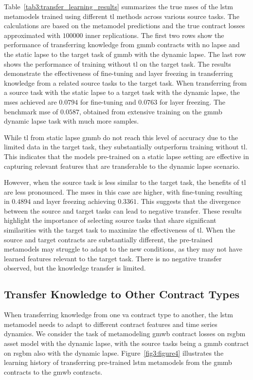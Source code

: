 Table~\ref{tab3:transfer_learning_results} summarizes the true \gls{mse}s of the \gls{lstm} metamodels trained using different \gls{tl} methods across various source tasks.
The calculations are based on the metamodel predictions and the true contract losses approximated with $\num{100000}$ inner replications.
The first two rows show the performance of transferring knowledge from \gls{gmmb} contracts with no lapse and the static lapse to the target task of \gls{gmmb} with the dynamic lapse.
The last row shows the performance of training without \gls{tl} on the target task.
The results demonstrate the effectiveness of fine-tuning and layer freezing in transferring knowledge from a related source tasks to the target task. 
When transferring from a source task with the static lapse to a target task with the dynamic lapse, the \gls{mse}s achieved are $0.0794$ for fine-tuning and $0.0763$ for layer freezing.
The benchmark \gls{mse} of $0.0587$, obtained from extensive training on the \gls{gmmb} dynamic lapse task with much more samples.

While \gls{tl} from static lapse \gls{gmmb} do not reach this level of accuracy due to the limited data in the target task, they substantially outperform training without \gls{tl}. 
This indicates that the models pre-trained on a static lapse setting are effective in capturing relevant features that are transferable to the dynamic lapse scenario.

However, when the source task is less similar to the target task, the benefits of \gls{tl} are less pronounced. The \gls{mse}s in this case are higher, with fine-tuning resulting in $0.4894$ and layer freezing achieving $0.3361$. 
This suggests that the divergence between the source and target tasks can lead to negative transfer.
These results highlight the importance of selecting source tasks that share significant similarities with the target task to maximize the effectiveness of \gls{tl}. 
When the source and target contracts are substantially different, the pre-trained metamodels may struggle to adapt to the new conditions, as they may not have learned features relevant to the target task.
There is no negative transfer observed, but the knowledge transfer is limited.

\subsection{Transfer Knowledge to Other Contract Types}

When transferring knowledge from one \gls{va} contract type to another, the \gls{lstm} metamodel needs to adapt to different contract features and time series dynamics.
We consider the task of metamodeling \gls{gmwb} contract losses on \gls{rsgbm} asset model with the dynamic lapse, with the source tasks being a \gls{gmmb} contract on \gls{rsgbm} also with the dynamic lapse.
Figure~\ref{fig3:figure4} illustrates the learning history of transferring pre-trained \gls{lstm} metamodels from the \gls{gmmb} contracts to the \gls{gmwb} contracts.


